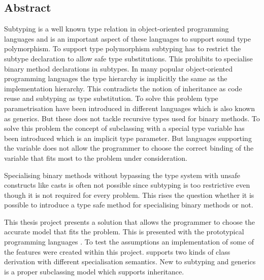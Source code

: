 %
%
\subsection*{Abstract}
Subtyping is a well known type relation in object-oriented
programming languages and is an important aspect of these languages
to support sound type polymorphism. To support type polymorphism
subtyping has to restrict the subtype declaration to allow safe type
substitutions. This prohibits to specialise binary method declarations in
subtypes. In many popular object-oriented programming languages the type
hierarchy is implicitly the same as the implementation hierarchy. This
contradicts the notion of inheritance as code reuse and subtyping as type
substitution. To solve this problem type parametrisation have been introduced in
different languages which is also known as generics. But these does not
tackle recursive types used for binary methods. To solve this problem
the concept of subclassing with a special type variable \mytype has been
introduced which is an implicit type parameter. But languages supporting
the \mytype variable does not allow the programmer to choose the correct
binding of the variable that fits most to the problem under consideration.

Specialising binary methods without bypassing the type system with
unsafe constructs like casts is often not possible since subtyping is
too restrictive even though it is not required for every problem. This
rises the question whether it is possible to introduce a type safe method
for specialising binary methods or not.

This thesis project presents a solution that allows the programmer to
choose the accurate model that fits the problem. This is presented
with the prototypical programming languages \ooplss. To test the
assumptions an implementation of some of the features were created
within this project. \ooplss supports two kinds of class derivation
with different specialisation semantics. New to subtyping and generics
is a proper subclassing model which supports inheritance.

